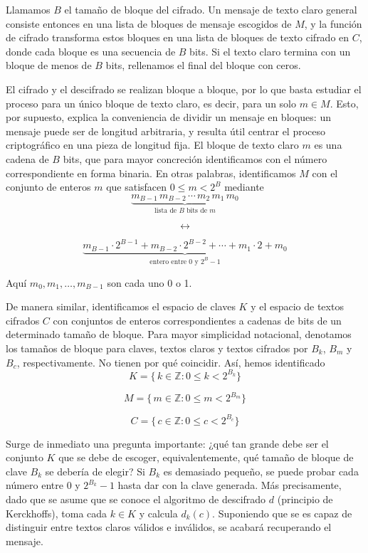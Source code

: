 Llamamos \(B\) el tamaño de bloque del cifrado. Un mensaje de texto claro general consiste entonces en una lista de bloques de mensaje escogidos de \(M\), y la función de cifrado transforma estos bloques en una lista de bloques de texto cifrado en \(C\), donde cada bloque es una secuencia de \(B\) bits. Si el texto claro termina con un bloque de menos de \(B\) bits, rellenamos el final del bloque con ceros.

El cifrado y el descifrado se realizan bloque a bloque, por lo que basta estudiar el proceso para un único bloque de texto claro, es decir, para un solo \(m\in M\). Esto, por supuesto, explica la conveniencia de dividir un mensaje en bloques: un mensaje puede ser de longitud arbitraria, y resulta útil centrar el proceso criptográfico en una pieza de longitud fija. El bloque de texto claro \(m\) es una cadena de \(B\) bits, que para mayor concreción identificamos con el número correspondiente en forma binaria. En otras palabras, identificamos \(M\) con el conjunto de enteros \(m\) que satisfacen \(0 \le m < 2^B\) mediante
\[
\underbrace{m_{B-1}\,m_{B-2}\,\cdots\,m_2\,m_1\,m_0}_{\text{lista de \(B\) bits de \(m\)}}
\]

\[
\longleftrightarrow
\]

\[
\underbrace{m_{B-1}\cdot2^{B-1} + m_{B-2}\cdot2^{B-2} + \cdots + m_1\cdot2 + m_0}_{\text{entero entre 0 y \(2^B-1\)}}
\]

Aquí \(m_0,m_1,\dots,m_{B-1}\) son cada uno 0 o 1.

De manera similar, identificamos el espacio de claves \(K\) y el espacio de textos cifrados \(C\) con conjuntos de enteros correspondientes a cadenas de bits de un determinado tamaño de bloque. Para mayor simplicidad notacional, denotamos los tamaños de bloque para claves, textos claros y textos cifrados por \(B_k\), \(B_m\) y \(B_c\), respectivamente. No tienen por qué coincidir. Así, hemos identificado
\[
K = \{\,k \in \mathbb{Z} : 0 \le k < 2^{B_k}\}
\]

\[
M = \{\,m \in \mathbb{Z} : 0 \le m < 2^{B_m}\}
\]

\[
C = \{\,c \in \mathbb{Z} : 0 \le c < 2^{B_c}\}
\]


Surge de inmediato una pregunta importante: ¿qué tan grande debe ser el conjunto \(K\) que se debe de escoger, equivalentemente, qué tamaño de bloque de clave \(B_k\) se debería de elegir? Si \(B_k\) es demasiado pequeño, se puede probar cada número entre \(0\) y \(2^{B_k}-1\) hasta dar con la clave generada. Más precisamente, dado que se asume que se conoce el algoritmo de descifrado \(d\) (principio de Kerckhoffs), toma cada \(k\in K\) y calcula \(d_k(c)\). Suponiendo que se es capaz de distinguir entre textos claros válidos e inválidos, se acabará recuperando el mensaje.

